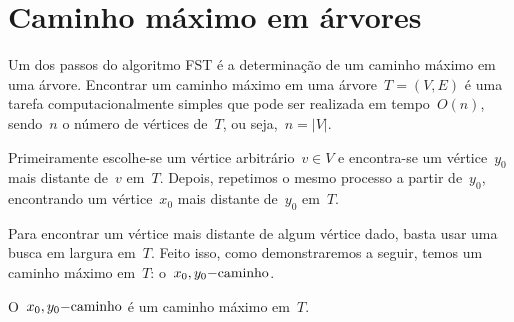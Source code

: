 \section{Caminho máximo em árvores}
\label{sec:caminhoMaximo}
	Um dos passos do algoritmo FST é a determinação 
	de um caminho máximo em uma árvore.
	Encontrar um caminho máximo em uma árvore~${T=(V,E)}$ é uma 
	tarefa computacionalmente simples que pode ser realizada em 
	tempo~$O(n)$, sendo~$n$ o número de vértices de~$T$, ou 
	seja,~${n =|V|}$. 

	Primeiramente escolhe-se um vértice arbitrário~$v \in V$ e 
	encontra-se um vértice~$y_0$ mais distante de~$v$ em~$T$.
	Depois, repetimos o mesmo processo a partir de~$y_0$, 
	encontrando um vértice~$x_0$ mais distante de~$y_0$ em~$T$.

	Para encontrar um vértice mais distante de algum vértice dado, 
	basta usar uma busca em largura em~$T$.  
	Feito isso, como demonstraremos a seguir,
	temos um caminho máximo em~$T$: o~$x_0,y_0\mathrm{-caminho}$.

	\bigskip

	\begin{lem}
	\label{lema:caminhoMax}
		O~$x_0,y_0\mathrm{-caminho}$ é um caminho máximo em~$T$.
	\end{lem}

	\bigskip

